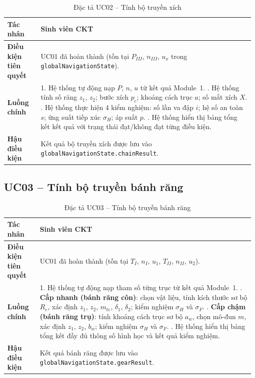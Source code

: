 \begin{table}[H]
\centering
\caption{Đặc tả UC02 -- Tính bộ truyền xích}
\label{tab:uc02}
\begin{tabularx}{\textwidth}{|l|X|}
\hline
\textbf{Tác nhân} & Sinh viên CKT \\
\hline
\textbf{Điều kiện tiên quyết} & UC01 đã hoàn thành (tồn tại $P_{III}$, $n_{III}$, $u_x$ trong \texttt{globalNavigationState}). \\
\hline
\textbf{Luồng chính} &
  1. Hệ thống tự động nạp $P$, $n$, $u$ từ kết quả Module~1. \newline
  2. Hệ thống tính số răng $z_1$, $z_2$; bước xích $p_c$; khoảng cách trục $a$; số mắt xích $X$. \newline
  3. Hệ thống thực hiện 4 kiểm nghiệm: số lần va đập $i$; hệ số an toàn $s$; ứng suất tiếp xúc $\sigma_H$; áp suất $p$. \newline
  4. Hệ thống hiển thị bảng tổng kết kết quả với trạng thái đạt/không đạt từng điều kiện. \\
\hline
\textbf{Hậu điều kiện} &
  Kết quả bộ truyền xích được lưu vào \texttt{globalNavigationState.chainResult}. \\
\hline
\end{tabularx}
\end{table}

\subsection{UC03 -- Tính bộ truyền bánh răng}

\begin{table}[H]
\centering
\caption{Đặc tả UC03 -- Tính bộ truyền bánh răng}
\label{tab:uc03}
\begin{tabularx}{\textwidth}{|l|X|}
\hline
\textbf{Tác nhân} & Sinh viên CKT \\
\hline
\textbf{Điều kiện tiên quyết} & UC01 đã hoàn thành (tồn tại $T_I$, $n_I$, $u_1$, $T_{II}$, $n_{II}$, $u_2$). \\
\hline
\textbf{Luồng chính} &
  1. Hệ thống tự động nạp tham số từng trục từ kết quả Module~1. \newline
  2. \textbf{Cấp nhanh (bánh răng côn)}: chọn vật liệu, tính kích thước sơ bộ $R_e$, xác định $z_1$, $z_2$, $m_{te}$, $\delta_1$, $\delta_2$; kiểm nghiệm $\sigma_H$ và $\sigma_F$. \newline
  3. \textbf{Cấp chậm (bánh răng trụ)}: tính khoảng cách trục sơ bộ $a_w$, chọn mô-đun $m$, xác định $z_1$, $z_2$, $b_w$; kiểm nghiệm $\sigma_H$ và $\sigma_F$. \newline
  4. Hệ thống hiển thị bảng tổng kết đầy đủ thông số hình học và kết quả kiểm nghiệm. \\
\hline
\textbf{Hậu điều kiện} &
  Kết quả bánh răng được lưu vào \texttt{globalNavigationState.gearResult}. \\
\hline
\end{tabularx}
\end{table}

